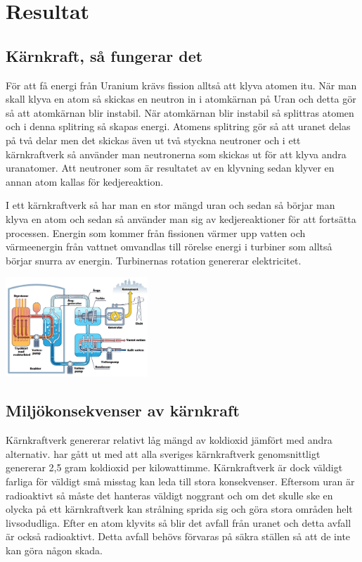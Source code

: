 \documentclass[11p]{article}
\begin{document}
    \section{Resultat}

    \subsection{Kärnkraft, så fungerar det}
    För att få energi från Uranium krävs fission alltså att klyva atomen itu.
    När man skall klyva en atom så skickas en neutron in i atomkärnan på Uran och detta gör så att atomkärnan blir instabil.
    När atomkärnan blir instabil så splittras atomen och i denna splitring så skapas energi.
    Atomens splitring gör så att uranet delas på två delar men det skickas även ut två styckna neutroner och i ett kärnkraftverk så använder man neutronerna som skickas ut för att klyva andra uranatomer.
    Att neutroner som är resultatet av en klyvning sedan klyver en annan atom kallas för kedjereaktion.
    \parencite{Wikipedia}

    I ett kärnkraftverk så har man en stor mängd uran och sedan så börjar man klyva en atom och sedan så använder man sig av kedjereaktioner för att fortsätta processen.
    Energin som kommer från fissionen värmer upp vatten och värmeenergin från vattnet omvandlas till rörelse energi i turbiner som alltså börjar snurra av energin.
    Turbinernas rotation genererar elektricitet.
    \parencite{TekniskaMuseet}


\includegraphics[width=0.4\textwidth]{../images/karnkraftverk-2.jpg}


    \subsection{Miljökonsekvenser av kärnkraft}
    Kärnkraftverk genererar relativt låg mängd av koldioxid jämfört med andra alternativ.
    \textcite{Vattenfall} har gått ut med att alla sveriges kärnkraftverk genomsnittligt genererar 2,5 gram koldioxid per kilowattimme.
    Kärnkraftverk är dock väldigt farliga för väldigt små misstag kan leda till stora konsekvenser.
    Eftersom uran är radioaktivt så måste det hanteras väldigt noggrant och om det skulle ske en olycka på ett kärnkraftverk kan strålning sprida sig och göra stora områden helt livsodudliga.
    Efter en atom klyvits så blir det avfall från uranet och detta avfall är också radioaktivt.
    Detta avfall behövs förvaras på säkra ställen så att de inte kan göra någon skada.
\parencite{Vattenfall2}
\end{document}
